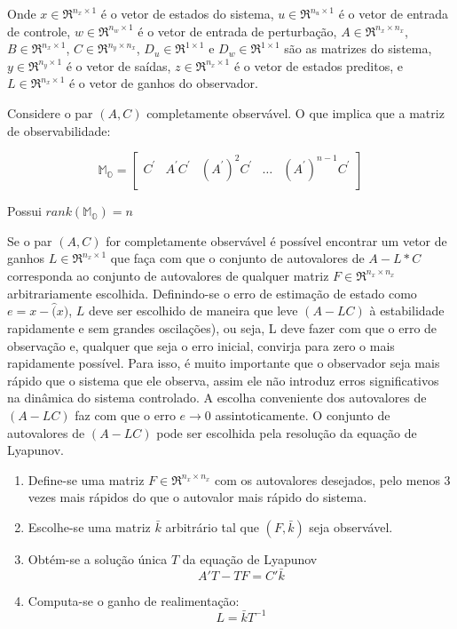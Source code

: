 Onde $x \in \Re^{n_{x} \times 1}$ é o vetor de estados do sistema, $u \in \Re^{n_{u} \times 1}$ é o vetor de entrada de controle, $w \in \Re^{n_{w} \times 1}$ é o vetor de entrada de perturbação, $A \in \Re^{n_{x} \times n_{x}}$, $B \in \Re^{n_{x} \times 1}$, $C \in \Re^{n_{y} \times n_{x}}$, $D_u \in \Re^{1 \times 1}$ e $D_w \in \Re^{1 \times 1}$ são as matrizes do sistema, $y \in \Re^{{n_{y} \times 1}}$ é o vetor de saídas, $z \in \Re^{n_{x} \times 1}$ é o vetor de estados preditos, e $L\in \Re^{n_{x} \times 1}$ é o vetor de ganhos do observador.

Considere o par $(A,C)$ completamente observável. O que implica que a matriz de observabilidade:

\begin{equation}\label{eq:Matrix:MO}
    \mathbb{M_O}=
    \begin{bmatrix}
        C^'&A^'C^'&(A^')^2C^'&\dots&(A^')^{n-1}C^'\\
    \end{bmatrix}        
\end{equation}

Possui $rank(\mathbb{M_O}) = n$
 
Se o par $(A,C)$ for completamente observável é possível encontrar um vetor de ganhos $L\in \Re^{n_{x} \times 1}$ que faça com que o conjunto de autovalores de $A-L*C$ corresponda ao conjunto de autovalores de qualquer matriz $F \in \Re^{n_{x} \times n_{x}}$ arbitrariamente escolhida. 
Definindo-se o erro de estimação de estado como $e=x-\hat(x)$, $L$ deve ser escolhido de maneira que leve $(A-LC)$ à estabilidade rapidamente e sem grandes oscilações), ou seja, L deve fazer com que o erro de observação e,
qualquer que seja o erro inicial, convirja para zero o mais rapidamente possível. Para isso, é muito importante que o observador seja mais rápido 
que o sistema que ele observa, assim ele não introduz erros significativos na dinâmica do sistema controlado. A escolha conveniente dos autovalores de $(A-LC)$ faz com que o erro $e\rightarrow0$ assintoticamente. 
O conjunto de autovalores de $(A-LC)$ pode ser escolhida pela resolução da equação de Lyapunov.
    
\begin{enumerate}
    \item Define-se uma matriz $F \in \Re^{n_{x} \times n_{x}}$ com os autovalores desejados, pelo menos 3 vezes mais rápidos do que o autovalor mais rápido do sistema.
    \item Escolhe-se uma matriz $\bar{k}$ arbitrário tal que $(F,\bar{k})$ seja observável.
    \item {Obtém-se a solução única $T$ da equação de Lyapunov
    \begin{equation} \label{eq:lyapunov}
            A'T-TF=C'\bar{k}
    \end{equation}}
    \item {Computa-se o ganho de realimentação:
    \begin{equation} \label{eq:ganho}
            L=\bar{k}T^{-1}
    \end{equation}}
\end{enumerate}  

